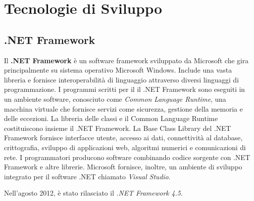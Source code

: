 \section{Tecnologie di Sviluppo}
\subsection{.NET Framework}
Il \textbf{.NET Framework} è un software framework sviluppato da Microsoft che gira principalmente su sistema operativo Microsoft Windows.
Include una vasta libreria e fornisce interoperabilità di linguaggio attraverso diversi linguaggi di programmazione.
I programmi scritti per il il .NET Framework sono eseguiti in un ambiente software, conosciuto come \emph{Common Language Runtime}, una macchina virtuale che fornisce servizi come sicurezza, gestione della memoria e delle eccezioni.
La libreria delle classi e il Common Language Runtime costituiscono insieme il .NET Framework.
La Base Class Library del .NET Framework fornisce interfacce utente, accesso ai dati, connettività al database, crittografia, sviluppo di applicazioni web, algoritmi numerici e comunicazioni di rete.
I programmatori producono software combinando codice sorgente con .NET Framework e altre librerie.
Microsoft fornisce, inoltre, un ambiente di sviluppo integrato per il software .NET chiamato \emph{Visual Studio}.

Nell'agosto 2012, è stato rilasciato il \emph{.NET Framework 4.5}.

